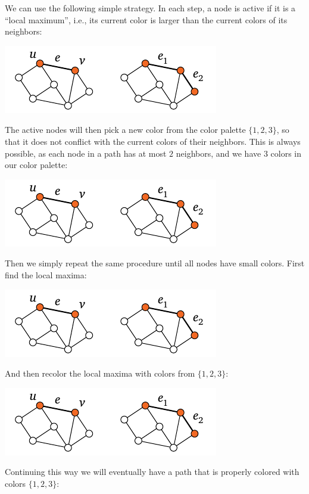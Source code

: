 We can use the following simple strategy. In each step, a node is active if it is a ``local maximum'', i.e., its current color is larger than the current colors of its neighbors:
\begin{center}
    \includegraphics[page=\PIntroIdA]{figs.pdf}
\end{center}
The active nodes will then pick a new color from the color palette $\{1,2,3\}$, so that it does not conflict with the current colors of their neighbors. This is always possible, as each node in a path has at most $2$ neighbors, and we have $3$ colors in our color palette:
\begin{center}
    \includegraphics[page=\PIntroIdAA]{figs.pdf}
\end{center}
Then we simply repeat the same procedure until all nodes have small colors. First find the local maxima:
\begin{center}
    \includegraphics[page=\PIntroIdB]{figs.pdf}
\end{center}
And then recolor the local maxima with colors from $\{1,2,3\}$:
\begin{center}
    \includegraphics[page=\PIntroIdBB]{figs.pdf}
\end{center}
Continuing this way we will eventually have a path that is properly colored with colors $\{1,2,3\}$:
